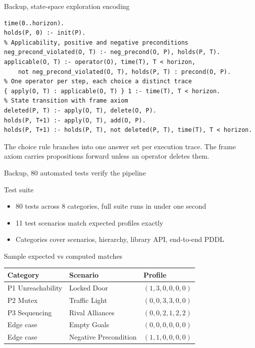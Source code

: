 \begin{frame}{Backup, state-space exploration encoding}
    \hypertarget{bk:asp-listing}{}
    \begin{lstlisting}[style=asp]
time(0..horizon).
holds(P, 0) :- init(P).
% Applicability, positive and negative preconditions
neg_precond_violated(O, T) :- neg_precond(O, P), holds(P, T).
applicable(O, T) :- operator(O), time(T), T < horizon,
    not neg_precond_violated(O, T), holds(P, T) : precond(O, P).
% One operator per step, each choice a distinct trace
{ apply(O, T) : applicable(O, T) } 1 :- time(T), T < horizon.
% State transition with frame axiom
deleted(P, T) :- apply(O, T), delete(O, P).
holds(P, T+1) :- apply(O, T), add(O, P).
holds(P, T+1) :- holds(P, T), not deleted(P, T), time(T), T < horizon.
    \end{lstlisting}
    The choice rule branches into one answer set per execution trace. The frame axiom carries propositions forward unless an operator deletes them.

\end{frame}

\begin{frame}[noframenumbering]{Backup, 80 automated tests verify the pipeline}
    \hypertarget{bk:validation}{}
    \begin{exampleblock}{Test suite}
        \begin{itemize}
            \item 80 tests across 8 categories, full suite runs in under one second
            \item 11 test scenarios match expected profiles exactly
            \item Categories cover scenarios, hierarchy, library API, end-to-end PDDL
        \end{itemize}
    \end{exampleblock}

    \begin{block}{Sample expected vs computed matches}
        \centering
        \scriptsize
        \begin{tabular}{lll}
            \toprule
            Category          & Scenario              & Profile              \\
            \midrule
            P1 Unreachability & Locked Door           & $(1, 3, 0, 0, 0, 0)$ \\
            P2 Mutex          & Traffic Light         & $(0, 0, 3, 3, 0, 0)$ \\
            P3 Sequencing     & Rival Alliances       & $(0, 0, 2, 1, 2, 2)$ \\
            Edge case         & Empty Goals           & $(0, 0, 0, 0, 0, 0)$ \\
            Edge case         & Negative Precondition & $(1, 1, 0, 0, 0, 0)$ \\
            \bottomrule
        \end{tabular}
    \end{block}

\end{frame}


